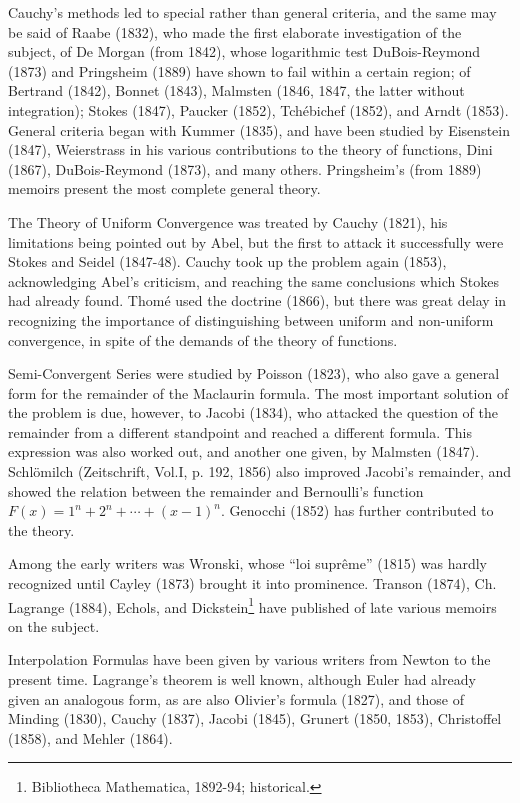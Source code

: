 \documentclass[oneside]{book}
\begin{document}
{Cauchy's methods led to special rather than general criteria, and
the same may be said of Raabe (1832), who made the first elaborate
investigation of the subject, of De Morgan (from 1842), whose
logarithmic test DuBois-Reymond (1873) and Pringsheim (1889) have
shown to fail within a certain region; of Bertrand (1842), Bonnet
(1843), Malmsten (1846, 1847, the latter without integration);
Stokes (1847), Paucker (1852), Tch\'ebichef (1852), and Arndt
(1853). General criteria began with Kummer (1835), and have been
studied by Eisenstein (1847), Weierstrass in his various
contributions to the theory of functions, Dini (1867),
DuBois-Reymond (1873), and many others. Pringsheim's (from 1889)
memoirs present the most complete general theory.

The Theory of Uniform Convergence was treated by Cauchy (1821), his
limitations being pointed out by Abel, but the first to attack it
successfully were Stokes and Seidel (1847-48). Cauchy took up the
problem again (1853), acknowledging Abel's criticism, and reaching
the same conclusions which Stokes had already found. Thom\'e used the
doctrine (1866), but there was great delay in recognizing the
importance of distinguishing between uniform and non-uniform
convergence, in spite of the demands of the theory of functions.

Semi-Convergent Series were studied by Poisson (1823), who also gave
a general form for the remainder of the Maclaurin formula. The most
important solution of the problem is due, however, to Jacobi (1834),
who attacked the question of the remainder from a different
standpoint and reached a different formula. This expression was
also worked out, and another one given, by Malmsten (1847).
Schl\"omilch (Zeitschrift, Vol.I, p. 192, 1856) also
improved Jacobi's remainder, and showed the relation between the
remainder and Bernoulli's function $F(x) = 1^n + 2^n + \cdots + (x -
1)^n$. Genocchi (1852) has further contributed to the theory.

Among the early writers was Wronski, whose ``loi supr\^eme'' (1815)
was hardly recognized until Cayley (1873) brought it into
prominence. Transon (1874), Ch. Lagrange (1884), Echols, and
Dickstein\footnote{Bibliotheca Mathematica, 1892-94; historical.}
have published of late various memoirs on the subject.

Interpolation Formulas have been given by various writers from
Newton to the present time. Lagrange's theorem is well known,
although Euler had already given an analogous form, as are also
Olivier's formula (1827), and those of Minding (1830), Cauchy
(1837), Jacobi (1845), Grunert (1850, 1853), Christoffel (1858), and
Mehler (1864).

}
\end{document}

